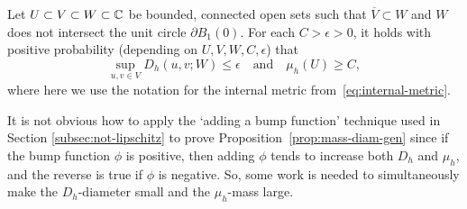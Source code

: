 \documentclass[12pt]{amsart}
\numberwithin{equation}{section}
\begin{document}
	\begin{prop} \label{prop:mass-diam-gen}
		Let $U \subset V \subset W\subset  \mathbb{C}$ be bounded, connected open sets such that $\overline V\subset W$ and $W$ does not intersect the unit circle $\partial  B_1(0)$.
		For each $C>\epsilon > 0$, it holds with positive probability (depending on $U,V,W,C,\epsilon$) that
		\begin{equation} \label{eq:mass-diam-gen}
		\sup_{u,v\in V} D_h\left( u , v ; W \right) \leq \epsilon \quad \text{and} \quad \mu_h(U) \geq C ,
		\end{equation}
		where here we use the notation for the internal metric from~\eqref{eq:internal-metric}.
	\end{prop}
	It is not obvious how to apply the `adding a bump function' technique used in Section \ref{subsec:not-lipschitz} to prove Proposition~\ref{prop:mass-diam-gen} since if the bump function $\phi$ is positive, then adding $\phi$ tends to increase both $D_h$ and $\mu_h$, and the reverse is true if $\phi$ is negative. So, some work is needed to simultaneously make the $D_h$-diameter small and the $\mu_h$-mass large. 
	
\end{document}
